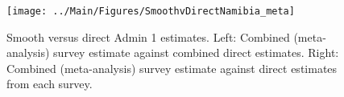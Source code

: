 \documentclass[12pt]{article}\usepackage[]{graphicx}\usepackage[]{color}
\newenvironment{knitrout}{}{} %
\begin{document}



\begin{knitrout}
\color{fgcolor}\begin{figure}[bht]

{\centering \texttt{[image: ../Main/Figures/SmoothvDirectNamibia\_meta]} 

}

\caption[Smooth versus direct Admin 1 estimates]{Smooth versus direct Admin 1 estimates. Left: Combined (meta-analysis) survey estimate against combined direct estimates. Right: Combined (meta-analysis) survey estimate against direct estimates from each survey.}\label{fig:unnamed-chunk-243}
\end{figure}


\end{knitrout}
\end{document}
